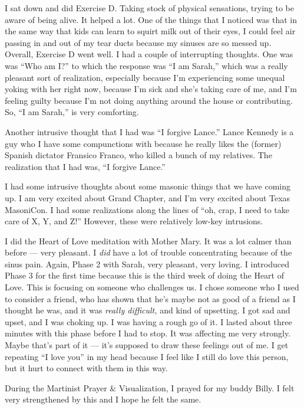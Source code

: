 \documentclass[b6paper]{article}
\begin{document}
I sat down and did Exercise D. Taking stock of physical sensations, trying to be aware of being alive. It helped a lot. One of the things that I noticed was that in the same way that kids can learn to squirt milk out of their eyes, I could feel air passing in and out of my tear ducts because my sinuses are so messed up. Overall, Exercise D went well. I had a couple of interrupting thoughts. One was was ``Who am I?'' to which the response was ``I am Sarah,'' which was a really pleasant sort of realization, especially because I'm experiencing some unequal yoking with her right now, because I'm sick and she's taking care of me, and I'm feeling guilty because I'm not doing anything around the house or contributing. So, ``I am Sarah,'' is very comforting. 

Another intrusive thought that I had was ``I forgive Lance.'' Lance Kennedy is a guy who I have some compunctions with because he really likes the (former) Spanish dictator Fransico Franco, who killed a bunch of my relatives. The realization that I had was, ``I forgive Lance.''

I had some intrusive thoughts about some masonic things that we have coming up. I am very excited about Grand Chapter, and I'm very excited about Texas MasoniCon. I had some realizations along the lines of ``oh, crap, I need to take care of X, Y, and Z!'' However, these were relatively low-key intrusions.

\pagebreak{}I did the Heart of Love meditation with Mother Mary. It was a lot calmer than before --- very pleasant. I \textit{did} have a lot of trouble concentrating because of the sinus pain. Again, Phase 2 with Sarah, very pleasant, very loving. I introduced Phase 3 for the first time because this is the third week of doing the Heart of Love. This is focusing on someone who challenges us. I chose someone who I used to consider a friend, who has shown that he's maybe not as good of a friend as I thought he was, and it was \textit{really difficult,} and kind of upsetting. I got sad and upset, and I was choking up. I was having a rough go of it. I lasted about three minutes with this phase before I had to stop. It was affecting me very strongly. Maybe that's part of it --- it's supposed to draw these feelings out of me. I get repeating ``I love you'' in my head because I feel like I still do love this person, but it hurt to connect with them in this way.

During the Martinist Prayer \& Visualization, I prayed for my buddy Billy. I felt very strengthened by this and I hope he felt the same.
\end{document}
